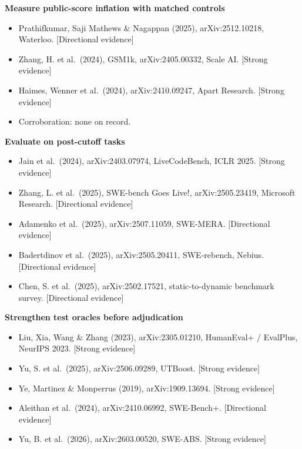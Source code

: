 \textbf{Measure public-score inflation with matched controls}

\begin{itemize}
\tightlist
\item
  Prathifkumar, Saji Mathews \& Nagappan (2025), arXiv:2512.10218, Waterloo. {[}Directional evidence{]}
\item
  Zhang, H. et al.~(2024), GSM1k, arXiv:2405.00332, Scale AI. {[}Strong evidence{]}
\item
  Haimes, Wenner et al.~(2024), arXiv:2410.09247, Apart Research. {[}Strong evidence{]}
\item
  Corroboration: none on record.
\end{itemize}

\textbf{Evaluate on post-cutoff tasks}

\begin{itemize}
\tightlist
\item
  Jain et al.~(2024), arXiv:2403.07974, LiveCodeBench, ICLR 2025. {[}Strong evidence{]}
\item
  Zhang, L. et al.~(2025), SWE-bench Goes Live!, arXiv:2505.23419, Microsoft Research. {[}Directional evidence{]}
\item
  Adamenko et al.~(2025), arXiv:2507.11059, SWE-MERA. {[}Directional evidence{]}
\item
  Badertdinov et al.~(2025), arXiv:2505.20411, SWE-rebench, Nebius. {[}Directional evidence{]}
\item
  Chen, S. et al.~(2025), arXiv:2502.17521, static-to-dynamic benchmark survey. {[}Directional evidence{]}
\end{itemize}

\textbf{Strengthen test oracles before adjudication}

\begin{itemize}
\tightlist
\item
  Liu, Xia, Wang \& Zhang (2023), arXiv:2305.01210, HumanEval+ / EvalPlus, NeurIPS 2023. {[}Strong evidence{]}
\item
  Yu, S. et al.~(2025), arXiv:2506.09289, UTBoost. {[}Strong evidence{]}
\item
  Ye, Martinez \& Monperrus (2019), arXiv:1909.13694. {[}Strong evidence{]}
\item
  Aleithan et al.~(2024), arXiv:2410.06992, SWE-Bench+. {[}Directional evidence{]}
\item
  Yu, B. et al.~(2026), arXiv:2603.00520, SWE-ABS. {[}Strong evidence{]}
\end{itemize}

